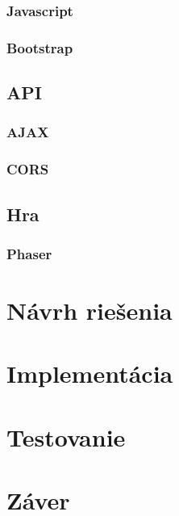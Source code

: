 \subsection{Javascript}

\subsection{Bootstrap}

\section{API}

\subsection{AJAX}

\subsection{CORS}

\section{Hra}

\subsection{Phaser}

\chapter{Návrh riešenia}

\chapter{Implementácia}

\chapter{Testovanie}

\chapter{Záver}












